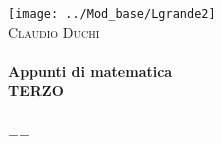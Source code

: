 \frontmatter
\begin{titlepage}
	
	\begin{center}
		
		
			
		\texttt{[image: ../Mod\_base/Lgrande2]}\\[1cm]    
		\textsc{\LARGE Claudio Duchi}\\[1.5cm]
		
		
		
		\HRule \\[0.4cm]
		{ \huge \bfseries Appunti di matematica}\\[0.4cm]
		{\bfseries TERZO}\\[0.4cm]
		\HRule \\[1.5cm]
		\vfill
		
		{\large $-$\DTMnow$-$}
		
	\end{center}
	
\end{titlepage}
\setcounter{page}{2}

\tableofcontents 
\cleardoublepage
\listoftables
{}
\cleardoublepage
\listoffigures
{}
\cleardoublepage\renewcommand{}
\lstlistoflistings{}
\mainmatter%

\glsaddall
\printglossaries
{}

\printindex

